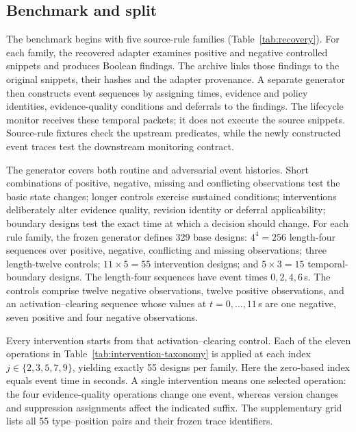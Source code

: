 \documentclass[preprint,11pt]{elsarticle}
\begin{document}
\subsection{Benchmark and split}
The benchmark begins with five source-rule families (Table~\ref{tab:recovery}). For each family, the recovered adapter examines positive and negative controlled snippets and produces Boolean findings. The archive links those findings to the original snippets, their hashes and the adapter provenance. A separate generator then constructs event sequences by assigning times, evidence and policy identities, evidence-quality conditions and deferrals to the findings. The lifecycle monitor receives these temporal packets; it does not execute the source snippets. Source-rule fixtures check the upstream predicates, while the newly constructed event traces test the downstream monitoring contract.

The generator covers both routine and adversarial event histories. Short combinations of positive, negative, missing and conflicting observations test the basic state changes; longer controls exercise sustained conditions; interventions deliberately alter evidence quality, revision identity or deferral applicability; boundary designs test the exact time at which a decision should change. For each rule family, the frozen generator defines 329 base designs: $4^4=256$ length-four sequences over positive, negative, conflicting and missing observations; three length-twelve controls; $11\times5=55$ intervention designs; and $5\times3=15$ temporal-boundary designs. The length-four sequences have event times $0,2,4,6$\,s. The controls comprise twelve negative observations, twelve positive observations, and an activation--clearing sequence whose values at $t=0,\ldots,11$\,s are one negative, seven positive and four negative observations.

Every intervention starts from that activation--clearing control. Each of the eleven operations in Table~\ref{tab:intervention-taxonomy} is applied at each index $j\in\{2,3,5,7,9\}$, yielding exactly 55 designs per family. Here the zero-based index equals event time in seconds. A single intervention means one selected operation: the four evidence-quality operations change one event, whereas version changes and suppression assignments affect the indicated suffix. The supplementary grid lists all 55 type--position pairs and their frozen trace identifiers.
\end{document}
